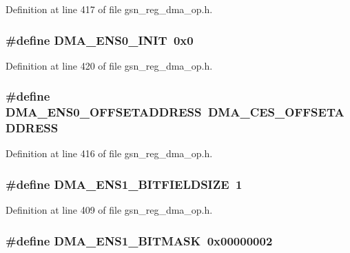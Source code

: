 Definition at line 417 of file gsn\_\-reg\_\-dma\_\-op.h.

\hypertarget{a00547_a61559eafe4af3c6a976af93c32e548b4}{
\subsubsection[{DMA\_\-ENS0\_\-INIT}]{\setlength{\rightskip}{0pt plus 5cm}\#define DMA\_\-ENS0\_\-INIT~0x0}}
\label{a00547_a61559eafe4af3c6a976af93c32e548b4}


Definition at line 420 of file gsn\_\-reg\_\-dma\_\-op.h.

\hypertarget{a00547_a22d32b205272ad0675e5cabe96946b37}{
\subsubsection[{DMA\_\-ENS0\_\-OFFSETADDRESS}]{\setlength{\rightskip}{0pt plus 5cm}\#define DMA\_\-ENS0\_\-OFFSETADDRESS~DMA\_\-CES\_\-OFFSETADDRESS}}
\label{a00547_a22d32b205272ad0675e5cabe96946b37}


Definition at line 416 of file gsn\_\-reg\_\-dma\_\-op.h.

\hypertarget{a00547_ad4ec8d52c1da03b09c103f95a9562dc9}{
\subsubsection[{DMA\_\-ENS1\_\-BITFIELDSIZE}]{\setlength{\rightskip}{0pt plus 5cm}\#define DMA\_\-ENS1\_\-BITFIELDSIZE~1}}
\label{a00547_ad4ec8d52c1da03b09c103f95a9562dc9}


Definition at line 409 of file gsn\_\-reg\_\-dma\_\-op.h.

\hypertarget{a00547_a9a018c3f3788b54c59594b91742a4287}{
\subsubsection[{DMA\_\-ENS1\_\-BITMASK}]{\setlength{\rightskip}{0pt plus 5cm}\#define DMA\_\-ENS1\_\-BITMASK~0x00000002}}
\label{a00547_a9a018c3f3788b54c59594b91742a4287}


